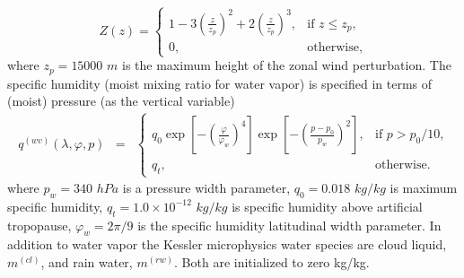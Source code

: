 \documentclass{agujournal}
\begin{document}
{\begin{equation}
Z(z) = \left\{ \begin{array}{ll} \displaystyle 1 - 3 \left( \frac{z}{z_p} \right)^2 + 2 \left( \frac{z}{z_p} \right)^3, & \mbox{if $z \leq z_p$,} \\ 0, & \mbox{otherwise,} \end{array} \right.
\end{equation}
where $z_p=15000$ $m$ is the maximum height of the zonal wind perturbation. The specific humidity (moist mixing ratio for water vapor) is specified in terms of (moist) pressure (as the vertical variable)
\begin{eqnarray}
q^{(wv)}(\lambda, \varphi, p) &=& \left\{ \begin{array}{ll} q_0 \exp\left[- \left(\frac{\varphi}{\varphi_{w}}\right)^4 \right] \exp\left[- \left(\frac{p-p_0}{p_{w}}\right)^2  \right], & \mbox{if $p > p_0 / 10$,} \\ q_{t}, & \mbox{otherwise.} \end{array} \right.
\end{eqnarray} 
where $p_w=340$ $hPa$ is a pressure width parameter, $q_0=0.018$ $kg/kg$ is maximum specific humidity, $q_t=1.0\times 10^{-12}$ $kg/kg$ is specific humidity above artificial tropopause, $\varphi_{w}=2\pi/9$ is the specific humidity latitudinal width parameter. In addition to water vapor the Kessler microphysics water species are cloud liquid, $m^{(cl)}$, and rain water, $m^{(rw)}$. Both are initialized to zero kg/kg.


%
%

%

}
\end{document}
